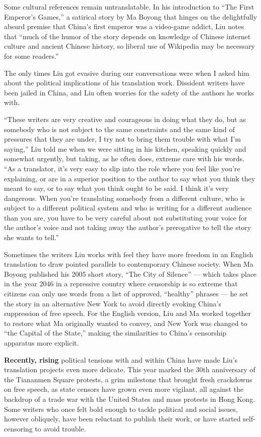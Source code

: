Some cultural references remain untranslatable. In his introduction to
``The First Emperor's Games,'' a satirical story by Ma Boyong that
hinges on the delightfully absurd premise that China's first emperor was
a video-game addict, Liu notes that ``much of the humor of the story
depends on knowledge of Chinese internet culture and ancient Chinese
history, so liberal use of Wikipedia may be necessary for some
readers.''

The only times Liu got evasive during our conversations were when I
asked him about the political implications of his translation work.
Dissident writers have been jailed in China, and Liu often worries for
the safety of the authors he works with.

``These writers are very creative and courageous in doing what they do,
but as somebody who is not subject to the same constraints and the same
kind of pressures that they are under, I try not to bring them trouble
with what I'm saying,'' Liu told me when we were sitting in his kitchen,
speaking quickly and somewhat urgently, but taking, as he often does,
extreme care with his words. ``As a translator, it's very easy to slip
into the role where you feel like you're explaining, or are in a
superior position to the author to say what you think they meant to say,
or to say what you think ought to be said. I think it's very dangerous.
When you're translating somebody from a different culture, who is
subject to a different political system and who is writing for a
different audience than you are, you have to be very careful about not
substituting your voice for the author's voice and not taking away the
author's prerogative to tell the story she wants to tell.''

Sometimes the writers Liu works with feel they have more freedom in an
English translation to draw pointed parallels to contemporary Chinese
society. When Ma Boyong published his 2005 short story, ``The City of
Silence'' --- which takes place in the year 2046 in a repressive country
where censorship is so extreme that citizens can only use words from a
list of approved, ``healthy'' phrases --- he set the story in an
alternative New York to avoid directly evoking China's suppression of
free speech. For the English version, Liu and Ma worked together to
restore what Ma originally wanted to convey, and New York was changed to
``the Capital of the State,'' making the similarities to China's
censorship apparatus more explicit.

\textbf{Recently, rising} political tensions with and within China have
made Liu's translation projects even more delicate. This year marked the
30th anniversary of the Tiananmen Square protests, a grim milestone that
brought fresh crackdowns on free speech, as state censors have grown
even more vigilant, all against the backdrop of a trade war with the
United States and mass protests in Hong Kong. Some writers who once felt
bold enough to tackle political and social issues, however obliquely,
have been reluctant to publish their work, or have started
self-censoring to avoid trouble.

